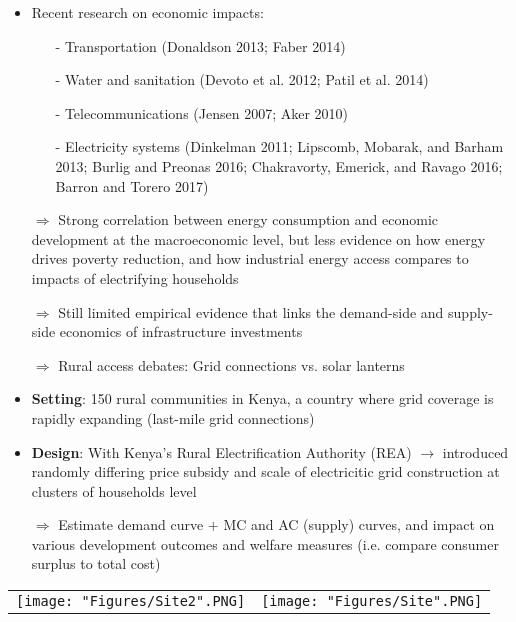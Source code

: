 \documentclass[compress]{beamer}
\begin{document}
\begin{frame}
\begin{itemize}
\item Recent research on economic impacts: \vspace{2mm}
\begin{itemize} \footnotesize \setlength{\itemsep}{0.5em}
\item[-] Transportation (Donaldson 2013; Faber 2014)
\item[-] Water and sanitation (Devoto et al. 2012; Patil et al. 2014)
\item[-] Telecommunications (Jensen 2007; Aker 2010)
\item[-] Electricity systems (Dinkelman 2011; Lipscomb, Mobarak, and Barham 2013; Burlig and Preonas 2016; Chakravorty, Emerick, and Ravago 2016; Barron and Torero 2017)
\end{itemize}
\item[$\Rightarrow$] Strong correlation between energy consumption
and economic development at the macroeconomic level, but less evidence on how energy drives
poverty reduction, and how industrial energy access compares to impacts of electrifying households
\item[$\Rightarrow$] Still limited empirical evidence that links the demand-side and supply-side economics of infrastructure investments
\item[$\Rightarrow$] Rural access debates: Grid connections vs.  solar lanterns
\end{itemize}
\end{frame}

\begin{frame}
\begin{itemize}
\item \textbf{Setting}: 150 rural communities in Kenya, a country where grid coverage is
rapidly expanding (last-mile grid connections)
\item \textbf{Design}: With Kenya's Rural Electrification Authority (REA) $\to$ introduced randomly differing price subsidy and scale of electricitic grid construction at clusters of households level
\item[$\Rightarrow$] Estimate demand curve $+$ MC and AC (supply) curves, and impact on various development outcomes and welfare measures (i.e. compare consumer surplus to total cost)
\end{itemize}
\end{frame}

\begin{frame}
\begin{adjustbox}{center}
\begin{tabular}{cc} 
\texttt{[image: "Figures/Site2".PNG]} &
\texttt{[image: "Figures/Site".PNG]}
\end{tabular}
\end{adjustbox}
\end{frame}
\end{document}
